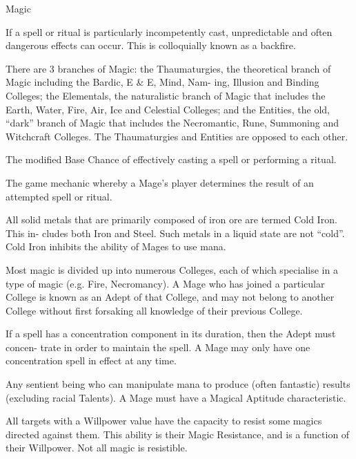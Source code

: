 \begin{Chapter}{Magic}
\begin{Description}
\item[Backfire] If a spell or ritual is particularly incompetently
  cast, unpredictable and often dangerous effects can occur.  This is
  colloquially known as a backfire.

\item[Branches of Magic] There are 3 branches of Magic: the
  Thaumaturgies, the theoretical branch of Magic including the Bardic,
  E \& E, Mind, Nam- ing, Illusion and Binding Colleges; the
  Elementals, the naturalistic branch of Magic that includes the
  Earth, Water, Fire, Air, Ice and Celestial Colleges; and the
  Entities, the old, “dark” branch of Magic that includes the
  Necromantic, Rune, Summoning and Witchcraft Colleges.  The
  Thaumaturgies and Entities are opposed to each other.

\item[Cast Chance] The modified Base Chance of effectively casting a
  spell or performing a ritual.

\item[Cast Check] The game mechanic whereby a Mage’s player determines
  the result of an attempted spell or ritual.

\item[Cold Iron] All solid metals that are primarily composed of iron
  ore are termed Cold Iron.  This in- cludes both Iron and Steel. Such
  metals in a liquid state are not “cold”. Cold Iron inhibits the
  ability of Mages to use mana.

\item[College ] Most magic is divided up into numerous Colleges, each
  of which specialise in a type of magic (e.g.  Fire, Necromancy).  A
  Mage who has joined a particular College is known as an Adept of
  that College, and may not belong to another College without first
  forsaking all knowledge of their previous College.

\item[Concentration] If a spell has a concentration component in its
  duration, then the Adept must concen- trate in order to maintain the
  spell.  A Mage may only have one concentration spell in effect at
  any time.

\item[Mage] Any sentient being who can manipulate mana to produce
  (often fantastic) results (excluding racial Talents). A Mage must
  have a Magical Aptitude characteristic.

\item[Magic Resistance] All targets with a Willpower value have the
  capacity to resist some magics directed against them.  This ability
  is their Magic Resistance, and is a function of their Willpower.
  Not all magic is resistible.


\end{Description}
\end{Chapter}

